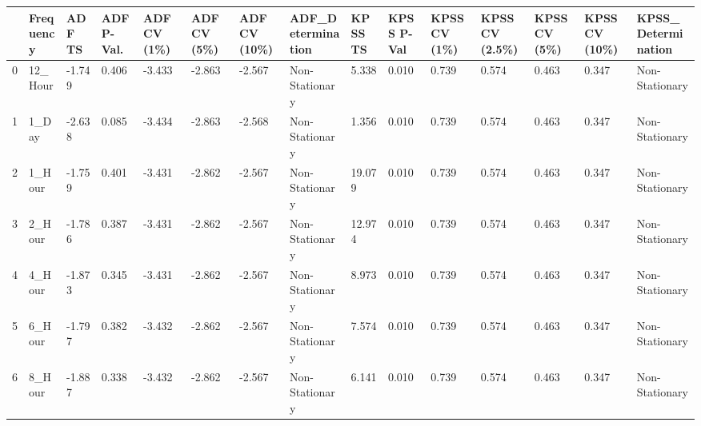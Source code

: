 \begin{tabular}{lllllllllllllll}
\toprule
 & Frequency & ADF TS & ADF P-Val. & ADF CV (1\%) & ADF CV (5\%) & ADF CV (10\%) & ADF_Determination & KPSS TS & KPSS P-Val & KPSS CV (1\%) & KPSS CV (2.5\%) & KPSS CV (5\%) & KPSS CV (10\%) & KPSS_Determination \\
\midrule
0 & 12_Hour & -1.749 & 0.406 & -3.433 & -2.863 & -2.567 & Non-Stationary & 5.338 & 0.010 & 0.739 & 0.574 & 0.463 & 0.347 & Non-Stationary \\
1 & 1_Day & -2.638 & 0.085 & -3.434 & -2.863 & -2.568 & Non-Stationary & 1.356 & 0.010 & 0.739 & 0.574 & 0.463 & 0.347 & Non-Stationary \\
2 & 1_Hour & -1.759 & 0.401 & -3.431 & -2.862 & -2.567 & Non-Stationary & 19.079 & 0.010 & 0.739 & 0.574 & 0.463 & 0.347 & Non-Stationary \\
3 & 2_Hour & -1.786 & 0.387 & -3.431 & -2.862 & -2.567 & Non-Stationary & 12.974 & 0.010 & 0.739 & 0.574 & 0.463 & 0.347 & Non-Stationary \\
4 & 4_Hour & -1.873 & 0.345 & -3.431 & -2.862 & -2.567 & Non-Stationary & 8.973 & 0.010 & 0.739 & 0.574 & 0.463 & 0.347 & Non-Stationary \\
5 & 6_Hour & -1.797 & 0.382 & -3.432 & -2.862 & -2.567 & Non-Stationary & 7.574 & 0.010 & 0.739 & 0.574 & 0.463 & 0.347 & Non-Stationary \\
6 & 8_Hour & -1.887 & 0.338 & -3.432 & -2.862 & -2.567 & Non-Stationary & 6.141 & 0.010 & 0.739 & 0.574 & 0.463 & 0.347 & Non-Stationary \\
\bottomrule
\end{tabular}
